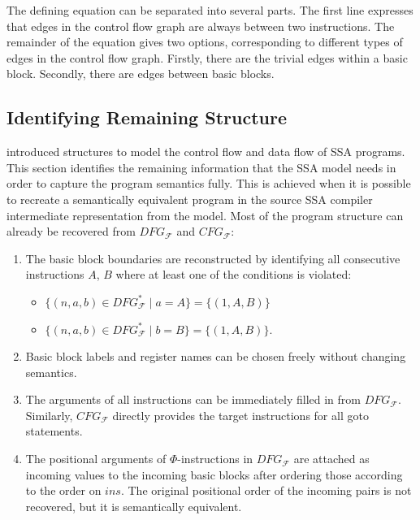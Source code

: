     The defining equation can be separated into several parts.
    The first line expresses that edges in the control flow graph are always
    between two instructions.
    The remainder of the equation gives two options, corresponding to different
    types of edges in the control flow graph.
    Firstly, there are the trivial edges within a basic block.
    Secondly, there are edges between basic blocks.


\subsection{Identifying Remaining Structure}
\label{sec:remainingstructure}

     introduced structures to model the control flow
    and data flow of SSA programs.
    This section identifies the remaining information that the SSA model needs
    in order to capture the program semantics fully.
    This is achieved when it is possible to recreate a semantically equivalent
    program in the source SSA compiler intermediate representation from the
    model.
    Most of the program structure can already be recovered from $DFG_\mathcal F$
    and $CFG_\mathcal F$:

\begin{enumerate}
    \item The basic block boundaries are reconstructed by identifying all
          consecutive instructions $A$, $B$ where at least one of the
          conditions is violated:
    \begin{itemize}
        \item $\{(n,a,b)\in DFG_\mathcal F^*\mid a=A\}=\{(1,A,B)\}$
        \item $\{(n,a,b)\in DFG_\mathcal F^*\mid b=B\}=\{(1,A,B)\}$.
    \end{itemize}
    \item Basic block labels and register names can be chosen freely
          without changing semantics.
    \item The arguments of all instructions can be immediately filled in from 
          $DFG_\mathcal F$.
          Similarly, $CFG_\mathcal F$ directly provides the target instructions
          for all goto statements.
    \item The positional arguments of $\Phi$-instructions in $DFG_\mathcal F$
          are attached as incoming values to the incoming basic blocks
          after ordering those according to the order on $ins$.
          The original positional order of the incoming pairs is
          not recovered, but it is semantically equivalent.
\end{enumerate}

